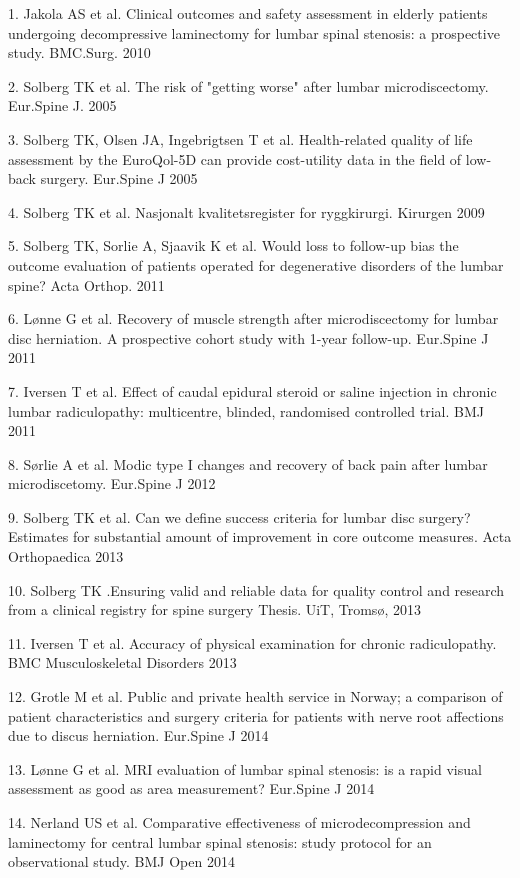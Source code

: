\documentclass[norsk, a4paper, twocolumn]{report}
\begin{document}
1.	Jakola AS  et al. Clinical outcomes and safety assessment in elderly patients undergoing decompressive laminectomy for lumbar spinal stenosis: a prospective study. BMC.Surg. 2010

2.	Solberg TK et al. The risk of "getting worse" after lumbar microdiscectomy. Eur.Spine J. 2005

3.	Solberg TK, Olsen JA, Ingebrigtsen T et al. Health-related quality of life assessment by the EuroQol-5D can provide cost-utility data in the field of low-back surgery. Eur.Spine J 2005

4.	Solberg TK et al. Nasjonalt kvalitetsregister for ryggkirurgi. Kirurgen 2009

5.	Solberg TK, Sorlie A, Sjaavik K et al. Would loss to follow-up bias the outcome evaluation of patients operated for degenerative disorders of the lumbar spine? Acta Orthop. 2011

6.	Lønne G et al. Recovery of muscle strength after microdiscectomy for lumbar disc herniation. A prospective cohort study with 1-year follow-up. Eur.Spine J 2011

7.	Iversen T et al. Effect of caudal epidural steroid or saline injection in
chronic lumbar radiculopathy: multicentre, blinded, randomised controlled trial. BMJ 2011

8.	Sørlie A et al. Modic type I changes and recovery of back pain after lumbar microdiscetomy.  Eur.Spine J 2012

9.	Solberg TK  et al. Can we define success criteria for lumbar disc surgery?
Estimates for substantial amount of improvement in core outcome measures.  Acta Orthopaedica 2013

10.	Solberg TK .Ensuring valid and reliable data for quality control and research from a clinical registry for spine surgery Thesis. UiT, Tromsø, 2013

11.	Iversen T et al. Accuracy of physical examination for chronic radiculopathy. BMC Musculoskeletal Disorders 2013

12.	Grotle M et al. Public and private health service in Norway; a comparison of patient characteristics and surgery criteria for patients with nerve root affections due to discus herniation. Eur.Spine J 2014

13.	Lønne G et al. MRI evaluation of lumbar spinal stenosis: is a rapid visual assessment as good as area measurement? Eur.Spine J 2014

14.	Nerland US et al. Comparative effectiveness of microdecompression and laminectomy for central lumbar spinal stenosis: study protocol for an observational study. BMJ Open 2014
\end{document}
